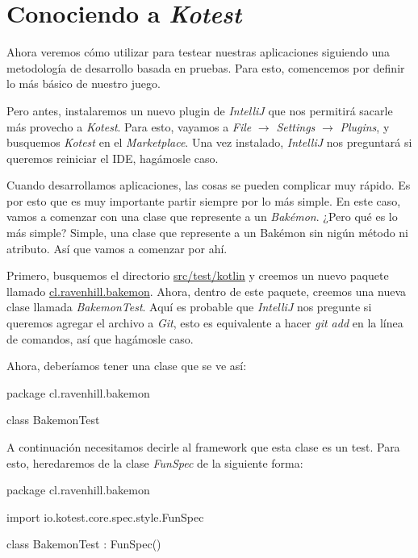\section{Conociendo a \textit{Kotest}}
\label{sec:conociendo-kotest}

  Ahora veremos cómo utilizar  para testear nuestras aplicaciones siguiendo una
  metodología de desarrollo basada en pruebas.
  Para esto, comencemos por definir lo más básico de nuestro juego.

  Pero antes, instalaremos un nuevo plugin de \textit{IntelliJ} que nos permitirá sacarle más 
  provecho a \textit{Kotest}.
  Para esto, vayamos a \textit{File} $\rightarrow$ \textit{Settings} $\rightarrow$ \textit{Plugins},
  y busquemos \textit{Kotest} en el \textit{Marketplace}.
  Una vez instalado, \textit{IntelliJ} nos preguntará si queremos reiniciar el IDE, hagámosle caso.

  Cuando desarrollamos aplicaciones, las cosas se pueden complicar muy rápido.
  Es por esto que es muy importante partir siempre por lo más simple.
  En este caso, vamos a comenzar con una clase que represente a un \textit{Bakémon}.
  ¿Pero qué es lo más simple?
  Simple, una clase que represente a un Bakémon sin nigún método ni atributo.
  Así que vamos a comenzar por ahí.

  Primero, busquemos el directorio \url{src/test/kotlin} y creemos un nuevo paquete llamado 
  \url{cl.ravenhill.bakemon}.
  Ahora, dentro de este paquete, creemos una nueva clase llamada \textit{BakemonTest}.
  Aquí es probable que \textit{IntelliJ} nos pregunte si queremos agregar el archivo a \textit{Git},
  esto es equivalente a hacer \textit{git add} en la línea de comandos, así que hagámosle caso.

  Ahora, deberíamos tener una clase que se ve así:

  \begin{kotlin}
    package cl.ravenhill.bakemon

    class BakemonTest {
    }
  \end{kotlin}

  A continuación necesitamos decirle al framework que esta clase es un test.
  Para esto, heredaremos de la clase \textit{FunSpec} de la siguiente forma:

  \begin{kotlin}
    package cl.ravenhill.bakemon

    import io.kotest.core.spec.style.FunSpec

    class BakemonTest : FunSpec({})
  \end{kotlin}

